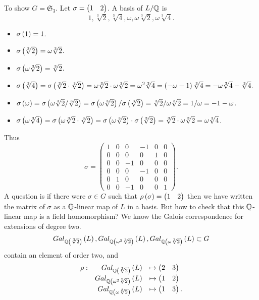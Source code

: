 \begin{example*}
To show $ G = \mathfrak{S}_3 $. Let $ \sigma = \onebytwo{1}{2} $. A basis of $ L / \Q $ is
$$ 1, \sqrt[3]{2}, \sqrt[3]{4}, \omega, \omega\sqrt[3]{2}, \omega\sqrt[3]{4}. $$
\begin{itemize}
\item $ \sigma\rb{1} = 1 $.
\item $ \sigma\rb{\sqrt[3]{2}} = \omega\sqrt[3]{2} $.
\item $ \sigma\rb{\omega\sqrt[3]{2}} = \sqrt[3]{2} $.
\item $ \sigma\rb{\sqrt[3]{4}} = \sigma\rb{\sqrt[3]{2} \cdot \sqrt[3]{2}} = \omega\sqrt[3]{2} \cdot \omega\sqrt[3]{2} = \omega^2\sqrt[3]{4} = \rb{-\omega - 1}\sqrt[3]{4} = -\omega\sqrt[3]{4} - \sqrt[3]{4} $.
\item $ \sigma\rb{\omega} = \sigma\rb{\omega\sqrt[3]{2} / \sqrt[3]{2}} = \sigma\rb{\omega\sqrt[3]{2}} / \sigma\rb{\sqrt[3]{2}} = \sqrt[3]{2} / \omega\sqrt[3]{2} = 1 / \omega = -1 - \omega $.
\item $ \sigma\rb{\omega\sqrt[3]{4}} = \sigma\rb{\omega\sqrt[3]{2} \cdot \sqrt[3]{2}} = \sigma\rb{\omega\sqrt[3]{2}} \cdot \sigma\rb{\sqrt[3]{2}} = \sqrt[3]{2} \cdot \omega\sqrt[3]{2} = \omega\sqrt[3]{4} $.
\end{itemize}
Thus
$$ \sigma =
\begin{pmatrix}
1 & 0 & 0 & -1 & 0 & 0 \\
0 & 0 & 0 & 0 & 1 & 0 \\
0 & 0 & -1 & 0 & 0 & 0 \\
0 & 0 & 0 & -1 & 0 & 0 \\
0 & 1 & 0 & 0 & 0 & 0 \\
0 & 0 & -1 & 0 & 0 & 1
\end{pmatrix}.
$$
A question is if there were $ \sigma \in G $ such that $ \rho\rb{\sigma} = \onebytwo{1}{2} $ then we have written the matrix of $ \sigma $ as a $ \Q $-linear map of $ L $ in a basis. But how to check that this $ \Q $-linear map is a field homomorphism? We know the Galois correspondence for extensions of degree two.
$$ Gal_{\Q\rb{\sqrt[3]{2}}}\rb{L}, Gal_{\Q\rb{\omega^2\sqrt[3]{2}}}\rb{L}, Gal_{\Q\rb{\omega\sqrt[3]{2}}}\rb{L} \subset G $$
contain an element of order two, and
$$
\begin{array}{rrl}
\rho : & Gal_{\Q\rb{\sqrt[3]{2}}}\rb{L} & \mapsto \onebytwo{2}{3} \\
& Gal_{\Q\rb{\omega^2\sqrt[3]{2}}}\rb{L} & \mapsto \onebytwo{1}{2} \\
& Gal_{\Q\rb{\omega\sqrt[3]{2}}}\rb{L} & \mapsto \onebytwo{1}{3}.

\end{array}$$
\end{example*}
